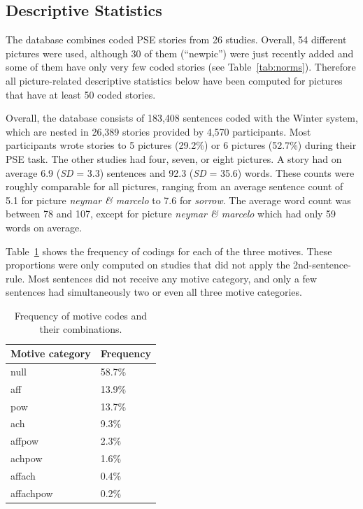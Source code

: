 \documentclass[man,a4paper,mask]{apa6}\usepackage[]{graphicx}\usepackage[]{color}
\begin{document}
\subsection{Descriptive Statistics}

The database combines coded PSE stories from 26 studies. Overall, 54 different pictures were used, although 30 of them (``newpic'') were just recently added and some of them have only very few coded stories (see Table~\ref{tab:norms}). Therefore all picture-related descriptive statistics below have been computed for pictures that have at least 50 coded stories.

Overall, the database consists of 183,408 sentences coded with the Winter system, which are nested in 26,389 stories provided by 4,570 participants. Most participants wrote stories to 5 pictures (29.2\%) or 6 pictures (52.7\%) during their PSE task. The other studies had four, seven, or eight pictures. A story had on average 6.9 (\emph{SD} = 3.3) sentences and 92.3 (\emph{SD} = 35.6) words. These counts were roughly comparable for all pictures, ranging from an average sentence count of 5.1 for picture \emph{neymar \& marcelo} to 7.6 for \emph{sorrow}. The average word count was between 78 and 107, except for picture \emph{neymar \& marcelo} which had only 59 words on average.


Table~\ref{tab:motcat} shows the frequency of codings for each of the three motives. These proportions were only computed on studies that did not apply the 2nd-sentence-rule. Most sentences did not receive any motive category, and only a few sentences had simultaneously two or even all three motive categories.

\begin{table}[ht]
\centering
\caption{Frequency of motive codes and their combinations.} 
\label{tab:motcat}
\begin{tabular}{ll}
  \hline
Motive category & Frequency \\ 
  \hline
null & 58.7\% \\ 
  aff & 13.9\% \\ 
  pow & 13.7\% \\ 
  ach & 9.3\% \\ 
  affpow & 2.3\% \\ 
  achpow & 1.6\% \\ 
  affach & 0.4\% \\ 
  affachpow & 0.2\% \\ 
   \hline
\end{tabular}
\end{table}
\end{document}

